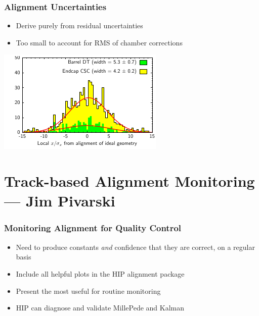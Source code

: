 \documentclass[compress]{beamer}
\begin{document}
\begin{frame}
  \frametitle{Alignment Uncertainties}
  
  \begin{itemize}
    \item Derive purely from residual uncertainties
    \item Too small to account for RMS of chamber corrections
  \end{itemize}

  \vspace{-0.25 cm}
  \begin{center}
    \includegraphics[width=0.9\linewidth]{alignoutput}
  \end{center}
\end{frame}

\section*{Track-based Alignment Monitoring --- Jim Pivarski}

\begin{frame}
  \frametitle{Monitoring Alignment for Quality Control}
  \begin{itemize}\setlength{\itemsep}{0.75 cm}
    \item Need to produce constants {\it and} confidence that they are correct, on a regular basis

    \item Include all helpful plots in the HIP alignment package

    \item Present the most useful for routine monitoring

    \item HIP can diagnose and validate MillePede and Kalman
  \end{itemize}
\end{frame}
\end{document}
